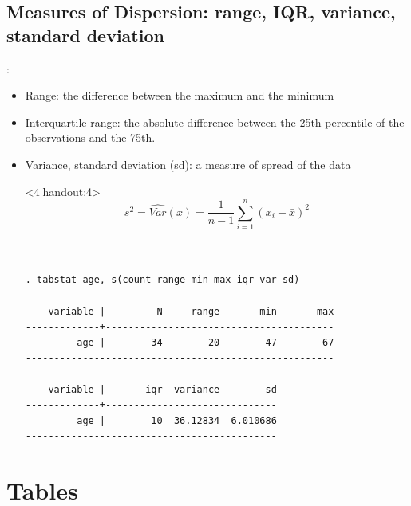 \subsection{Measures of Dispersion: range, IQR, variance, standard deviation}
\begin{frame}[fragile]{{\secname: \subsecname}}	
\begin{itemize}
	\item<1|handout:1-> Range: the difference between the maximum and the minimum 
	\item<2|handout:2-> Interquartile range: the absolute difference between the 25th percentile of the observations and the 75th.
	\item<3|handout:3-> Variance, standard deviation (sd): a measure of spread of the data
	\item[]<4|handout:4>
\footnotesize
	\begin{displaymath}
s^{2} = \widehat{Var}(x)=\frac{1}{n-1} \sum_{i=1}^{n}\left(x_{i}-\bar{x}\right)^{2}
\end{displaymath}

\scriptsize
\begin{verbatim}


. tabstat age, s(count range min max iqr var sd)

    variable |         N     range       min       max
-------------+----------------------------------------
         age |        34        20        47        67
------------------------------------------------------

    variable |       iqr  variance        sd
-------------+------------------------------
         age |        10  36.12834  6.010686
--------------------------------------------
\end{verbatim}

\end{itemize}
\end{frame}


\section{Tables}
